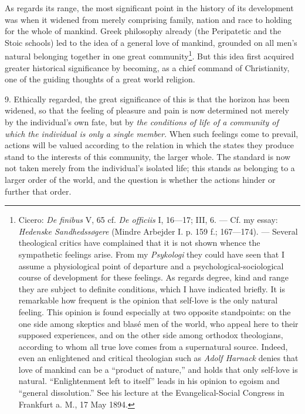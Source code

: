 \documentclass[12pt,a4paper,openany]{book}
\newcommand{\opage}[1]{\marginnote{\footnotesize\textit{[#1]}}}
\begin{document}
As regards its range, the most significant point in the history of its development was when it
widened from merely comprising family, nation and race to holding for the whole of mankind. Greek
philosophy already (the Peripatetic and the Stoic schools) led to the idea of a general love of
mankind, grounded on all men's natural belonging together in one great community\footnote[1]{Cicero:
\textit{De finibus} V, 65 cf. \textit{De officiis} I, 16---17; III, 6. --- Cf. my essay:
\textit{Hedenske Sandhedssøgere} (Mindre Arbejder I. p. 159 f.; 167---174). --- Several theological
critics have complained that it is not shown whence the sympathetic feelings arise. From my
\textit{Psykologi} they could have seen that I assume a physiological point of departure and a
psychological-sociological course of development for these feelings. As regards degree, kind and
range they are subject to definite conditions, which I have indicated briefly. It is remarkable how
frequent is the opinion that self-love is the only natural feeling. This opinion is found especially
at two opposite standpoints: on the one side among skeptics and blasé men of the world, who appeal
here to their supposed experiences, and on the other side among orthodox theologians, according to
whom all true love comes from a supernatural source. Indeed, even an enlightened and critical
theologian such as \emph{Adolf Harnack} denies that love of mankind can be a ``product of nature,''
and holds that only self-love is natural. ``Enlightenment left to itself'' leads in his opinion to
egoism and ``general dissolution.'' See his lecture at the Evangelical-Social Congress in Frankfurt
a. M., 17 May 1894.}. But this idea first acquired greater historical significance by becoming, as a
chief command of Christianity, one of the guiding thoughts of a great world religion.

9. Ethically regarded, the great significance of this is that the horizon
\opage{39}has been widened, so that the feeling of pleasure and pain is now determined not merely by the
individual's own fate, but by \textit{the conditions of life of a community of which the individual is
only a single member.} When such feelings come to prevail, actions will be valued according to the
relation in which the states they produce stand to the interests of this community, the larger
whole. The standard is now not taken merely from the individual's isolated life; this stands as
belonging to a larger order of the world, and the question is whether the actions hinder or further
that order.
\end{document}
